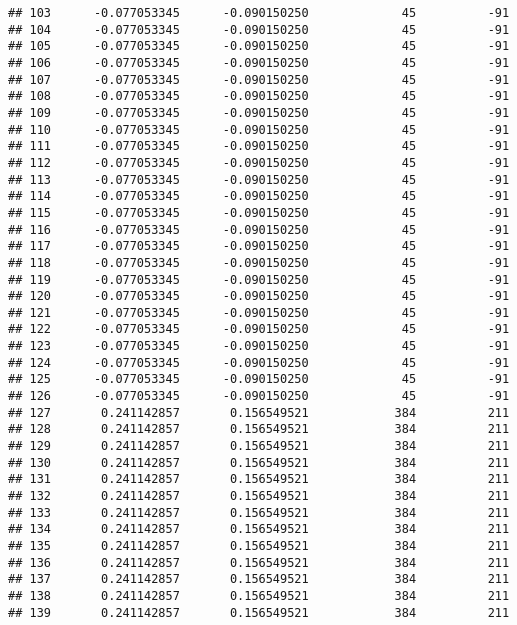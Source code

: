 \documentclass[]{article}
\begin{document}
\begin{verbatim}
## 103      -0.077053345      -0.090150250             45          -91
## 104      -0.077053345      -0.090150250             45          -91
## 105      -0.077053345      -0.090150250             45          -91
## 106      -0.077053345      -0.090150250             45          -91
## 107      -0.077053345      -0.090150250             45          -91
## 108      -0.077053345      -0.090150250             45          -91
## 109      -0.077053345      -0.090150250             45          -91
## 110      -0.077053345      -0.090150250             45          -91
## 111      -0.077053345      -0.090150250             45          -91
## 112      -0.077053345      -0.090150250             45          -91
## 113      -0.077053345      -0.090150250             45          -91
## 114      -0.077053345      -0.090150250             45          -91
## 115      -0.077053345      -0.090150250             45          -91
## 116      -0.077053345      -0.090150250             45          -91
## 117      -0.077053345      -0.090150250             45          -91
## 118      -0.077053345      -0.090150250             45          -91
## 119      -0.077053345      -0.090150250             45          -91
## 120      -0.077053345      -0.090150250             45          -91
## 121      -0.077053345      -0.090150250             45          -91
## 122      -0.077053345      -0.090150250             45          -91
## 123      -0.077053345      -0.090150250             45          -91
## 124      -0.077053345      -0.090150250             45          -91
## 125      -0.077053345      -0.090150250             45          -91
## 126      -0.077053345      -0.090150250             45          -91
## 127       0.241142857       0.156549521            384          211
## 128       0.241142857       0.156549521            384          211
## 129       0.241142857       0.156549521            384          211
## 130       0.241142857       0.156549521            384          211
## 131       0.241142857       0.156549521            384          211
## 132       0.241142857       0.156549521            384          211
## 133       0.241142857       0.156549521            384          211
## 134       0.241142857       0.156549521            384          211
## 135       0.241142857       0.156549521            384          211
## 136       0.241142857       0.156549521            384          211
## 137       0.241142857       0.156549521            384          211
## 138       0.241142857       0.156549521            384          211
## 139       0.241142857       0.156549521            384          211

\end{verbatim}
\end{document}
